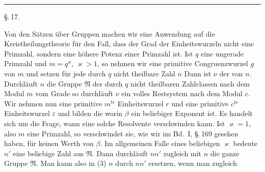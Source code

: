 \begin{center}


\rule{3cm}{0.4pt}

\S.\,17.

\end{center}

Von den S\"atzen \"uber  Gruppen machen wir eine
Anwendung auf die Kreistheilungstheorie f\"ur den Fall, dass der
Grad der Einheitswurzeln nicht eine Primzahl, sondern eine
h\"ohere Potenz einer Primzahl ist. Ist $q$ eine ungerade Primzahl
und $m = q^{\varkappa}$, $\varkappa > 1$, so nehmen wir eine primitive Congruenzwurzel
 $g$ von $m$ und setzen f\"ur jede durch $q$ nicht theilbare
 Zahl $n$
Dann ist $\nu$ der  von $n$. Durchl\"auft $n$ die Gruppe $\mathfrak{N}$
der durch $q$ nicht theilbaren Zahlclassen nach dem Modul $m$
vom Grade
so durchl\"auft $\nu$ ein volles Restsystem nach dem Modul $c$. Wir
nehmen nun eine primitive $m^{\text{te}}$ Einheitswurzel $r$ und eine primitive
 $c^{\text{te}}$ Einheitswurzel $\varepsilon$ und bilden die 
worin $\beta$ ein beliebiger Exponent ist. Es handelt sich um die
Frage, wann eine solche Resolvente verschwinden kann. Ist
$\varkappa = 1$, also $m$ eine Primzahl, so verschwindet sie, wie wir im
Bd.\ I, \S.\,169 gesehen haben, f\"ur keinen Werth von $\beta$. Im allgemeinen
 Falle eines beliebigen $\varkappa$ bedeute $n'$ eine beliebige Zahl
aus $\mathfrak{N}$. Dann durchl\"auft $n n'$ zugleich mit $n$ die ganze Gruppe $\mathfrak{N}$.
Man kann also in (3) $n$ durch $n n'$ ersetzen, wenn man zugleich
